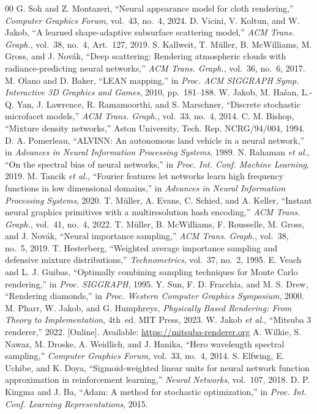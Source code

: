 \documentclass[conference]{IEEEtran}
\begin{document}
\begin{thebibliography}{00}
 G. Soh and Z. Montazeri, ``Neural appearance model for cloth rendering,'' \emph{Computer Graphics Forum}, vol.~43, no.~4, 2024.
 D. Vicini, V. Koltun, and W. Jakob, ``A learned shape-adaptive subsurface scattering model,'' \emph{ACM Trans. Graph.}, vol.~38, no.~4, Art.~127, 2019.
 S. Kallweit, T. M\"uller, B. McWilliams, M. Gross, and J. Nov\'ak, ``Deep scattering: Rendering atmospheric clouds with radiance-predicting neural networks,'' \emph{ACM Trans. Graph.}, vol.~36, no.~6, 2017.
 M. Olano and D. Baker, ``LEAN mapping,'' in \emph{Proc. ACM SIGGRAPH Symp. Interactive 3D Graphics and Games}, 2010, pp.~181--188.
 W. Jakob, M. Ha\v{s}an, L.-Q. Yan, J. Lawrence, R. Ramamoorthi, and S. Marschner, ``Discrete stochastic microfacet models,'' \emph{ACM Trans. Graph.}, vol.~33, no.~4, 2014.
 C. M. Bishop, ``Mixture density networks,'' Aston University, Tech. Rep. NCRG/94/004, 1994.
 D. A. Pomerleau, ``ALVINN: An autonomous land vehicle in a neural network,'' in \emph{Advances in Neural Information Processing Systems}, 1989.
 N. Rahaman \emph{et al.}, ``On the spectral bias of neural networks,'' in \emph{Proc. Int. Conf. Machine Learning}, 2019.
 M. Tancik \emph{et al.}, ``Fourier features let networks learn high frequency functions in low dimensional domains,'' in \emph{Advances in Neural Information Processing Systems}, 2020.
 T. M\"uller, A. Evans, C. Schied, and A. Keller, ``Instant neural graphics primitives with a multiresolution hash encoding,'' \emph{ACM Trans. Graph.}, vol.~41, no.~4, 2022.
 T. M\"uller, B. McWilliams, F. Rousselle, M. Gross, and J. Nov\'ak, ``Neural importance sampling,'' \emph{ACM Trans. Graph.}, vol.~38, no.~5, 2019.
 T. Hesterberg, ``Weighted average importance sampling and defensive mixture distributions,'' \emph{Technometrics}, vol.~37, no.~2, 1995.
 E. Veach and L. J. Guibas, ``Optimally combining sampling techniques for Monte Carlo rendering,'' in \emph{Proc. SIGGRAPH}, 1995.
 Y. Sun, F. D. Fracchia, and M. S. Drew, ``Rendering diamonds,'' in \emph{Proc. Western Computer Graphics Symposium}, 2000.
 M. Pharr, W. Jakob, and G. Humphreys, \emph{Physically Based Rendering: From Theory to Implementation}, 4th~ed. MIT Press, 2023.
 W. Jakob \emph{et al.}, ``Mitsuba 3 renderer,'' 2022. [Online]. Available: \url{https://mitsuba-renderer.org}
 A. Wilkie, S. Nawaz, M. Droske, A. Weidlich, and J. Hanika, ``Hero wavelength spectral sampling,'' \emph{Computer Graphics Forum}, vol.~33, no.~4, 2014.
 S. Elfwing, E. Uchibe, and K. Doya, ``Sigmoid-weighted linear units for neural network function approximation in reinforcement learning,'' \emph{Neural Networks}, vol.~107, 2018.
 D. P. Kingma and J. Ba, ``Adam: A method for stochastic optimization,'' in \emph{Proc. Int. Conf. Learning Representations}, 2015.
\end{thebibliography}
\end{document}
